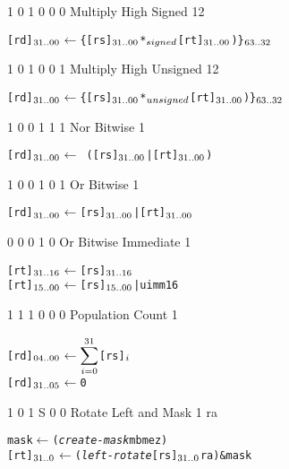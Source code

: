   {1 0 1 0 0 0}    {Multiply High Signed}             {1}{2}    {\RawTag}
\begin{alltt}
        [rd]\({\sb{31..00}}\) \(\leftarrow\) \{ [rs]\({\sb{31..00}}\) *\({\sb{signed}}\) [rt]\({\sb{31..00}}\)) \}\(\sb{63..32}\)
\end{alltt}\rawInstrEnd

  {1 0 1 0 0 1}    {Multiply High Unsigned}             {1}{2}    {\RawTag}
\begin{alltt}
        [rd]\({\sb{31..00}}\) \(\leftarrow\) \{ [rs]\({\sb{31..00}}\) *\({\sb{unsigned}}\) [rt]\({\sb{31..00}}\)) \}\(\sb{63..32}\)
\end{alltt}\rawInstrEnd

   {1 0 0 1 1 1}    {Nor Bitwise}                      {1}    {\MIPSTag}
\begin{alltt}
        [rd]\({\sb{31..00}}\) \(\leftarrow\) ~([rs]\({\sb{31..00}}\) | [rt]\({\sb{31..00}}\))
\end{alltt}\rawInstrEnd

    {1 0 0 1 0 1}    {Or Bitwise}                       {1}    {\MIPSTag}
\begin{alltt}
        [rd]\({\sb{31..00}}\) \(\leftarrow\) [rs]\({\sb{31..00}}\) | [rt]\({\sb{31..00}}\)
\end{alltt}\rawInstrEnd

    {0 0 0 1 0}    {Or Bitwise Immediate}              {1}    {\MIPSTag}
\begin{alltt}
        [rt]\({\sb{31..16}}\) \(\leftarrow\) [rs]\({\sb{31..16}}\)
        [rt]\({\sb{15..00}}\) \(\leftarrow\) [rs]\({\sb{15..00}}\) | uimm16
\end{alltt}\rawInstrEnd

   {1 1 1 0 0 0}    {Population Count}               {1}    {\RawTag}
\begin{alltt}
        [rd]\({\sb{04..00}}\) \(\leftarrow\) \(\displaystyle\sum\sb{i=0}\sp{31}\) [rs]\({\sb{i}}\)
        [rd]\({\sb{31..05}}\) \(\leftarrow\) 0
\end{alltt}\rawInstrEnd

 {1 0 1 S 0 0} { Rotate Left and Mask }  {1} {\RawTag} {ra}
\begin{alltt}
        mask    \(\leftarrow\) ({\em{create-mask}} mb me z)
        [rt]\(\sb{31..0}\) \(\leftarrow\) ({\em{left-rotate}} [rs]\(\sb{31..0}\) ra) & mask
\end{alltt}\rawInstrEnd

